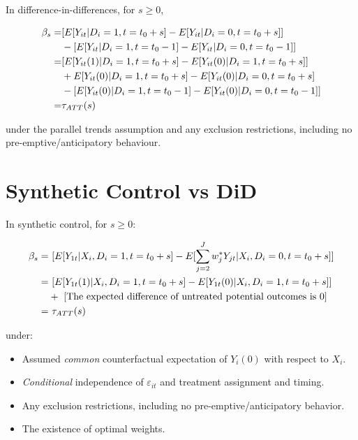 \documentclass[
  letterpaper,
  DIV=11,
  numbers=noendperiod]{scrreprt}
\providecommand{\tightlist}{%
  \setlength{\itemsep}{0pt}\setlength{\parskip}{0pt}}\usepackage{longtable,booktabs,array}
\theoremstyle{definition}
\theoremstyle{remark}
\begin{document}
In difference-in-differences, for \(s \geq 0\),

\[
\begin{aligned}
\beta_s =& [E[Y_{it}|D_i=1,t = t_0+s] - E[Y_{it}|D_i=0,t = t_0+s]] \\
& - [E[Y_{it}|D_i=1,t = t_0-1] - E[Y_{it}|D_i=0,t=t_0-1]] \\
=& [E[Y_{it}(1)|D_i=1,t = t_0+s] - E[Y_{it}(0)|D_i=1,t = t_0+s]] \\
& + E[Y_{it}(0)|D_i=1,t = t_0+s] - E[Y_{it}(0)|D_i=0,t = t_0+s] \\
& - [E[Y_{it}(0)|D_i=1,t = t_0-1] - E[Y_{it}(0)|D_i=0,t=t_0-1]] \\
=& \tau_{\scriptsize{ATT}}(s)
\end{aligned}
\]

under the parallel trends assumption and any exclusion restrictions,
including no pre-emptive/anticipatory behaviour.

\section*{Synthetic Control vs DiD}\label{synthetic-control-vs-did-1}


In synthetic control, for \(s \geq 0\):

\[
\begin{aligned}
\beta_s =& \ [E[Y_{1t}|X_i, D_i=1,t = t_0+s] - E[\sum_{j=2}^J w^*_jY_{jt}|X_i, D_i=0,t = t_0+s]] \\
=& \ [E[Y_{1t}(1)|X_i, D_i=1,t = t_0+s] - E[Y_{1t}(0)|X_i, D_i=1,t = t_0+s]] \\
&+ \ [\text{The expected difference of untreated potential outcomes is 0}] \\
=& \ \tau_{\scriptsize{ATT}}(s)
\end{aligned}
\]

under:

\begin{itemize}
\tightlist
\item
  Assumed \emph{common} counterfactual expectation of \(Y_i(0)\) with
  respect to \(X_i\).
\item
  \emph{Conditional} independence of \(\varepsilon_{it}\) and treatment
  assignment and timing.
\item
  Any exclusion restrictions, including no pre-emptive/anticipatory
  behavior.
\item
  The existence of optimal weights.
\end{itemize}
\end{document}
